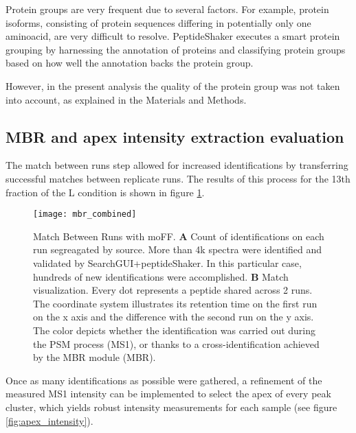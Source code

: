 Protein groups are very frequent due to several factors. For example, protein isoforms, consisting of protein sequences differing in potentially only one aminoacid, are very difficult to resolve. PeptideShaker executes a smart protein grouping by harnessing the annotation of proteins and classifying protein groups based on how well the annotation backs the protein group.

However, in the present analysis the quality of the protein group was not taken into account, as explained in the Materials and Methods.


\subsection{MBR and apex intensity extraction evaluation}

The match between runs step allowed for increased identifications by transferring successful matches between replicate runs. The results of this process for the 13th fraction of the L condition is shown in figure \ref{fig:mbr}.

\begin{figure}[H]
\centering
\texttt{[image: mbr\_combined]}
\caption[Proteome benchmark MBR results]{Match Between Runs with moFF. \textbf{A} Count of identifications on each run segreagated by source. More than 4k spectra were identified and validated by SearchGUI+peptideShaker. In this particular case, hundreds of new identifications were accomplished. \textbf{B} Match visualization. Every dot represents a peptide shared across 2 runs. The coordinate system illustrates its retention time on the first run on the x axis and the difference with the second run on the y axis. The color depicts whether the identification was carried out during the PSM process (MS1), or thanks to a cross-identification achieved by the MBR module (MBR).}
\label{fig:mbr}
\end{figure}

Once as many identifications as possible were gathered, a refinement of the measured MS1 intensity can be implemented to select the apex of every peak cluster, which yields robust intensity measurements for each sample (see figure \ref{fig:apex_intensity}). 

